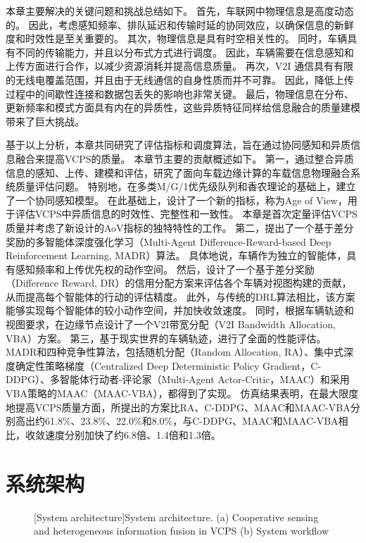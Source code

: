 本章主要解决的关键问题和挑战总结如下。
首先，车联网中物理信息是高度动态的。
因此，考虑感知频率、排队延迟和传输时延的协同效应，以确保信息的新鲜度和时效性是至关重要的。
其次，物理信息是具有时空相关性的。
同时，车辆具有不同的传输能力，并且以分布式方式进行调度。
因此，车辆需要在信息感知和上传方面进行合作，以减少资源消耗并提高信息质量。
再次，V2I 通信具有有限的无线电覆盖范围，并且由于无线通信的自身性质而并不可靠。
因此，降低上传过程中的间歇性连接和数据包丢失的影响也非常关键。
最后，物理信息在分布、更新频率和模式方面具有内在的异质性，这些异质特征同样给信息融合的质量建模带来了巨大挑战。

基于以上分析，本章共同研究了评估指标和调度算法，旨在通过协同感知和异质信息融合来提高VCPS的质量。
本章节主要的贡献概述如下。
第一，通过整合异质信息的感知、上传、建模和评估，研究了面向车载边缘计算的车载信息物理融合系统质量评估问题。
特别地，在多类M/G/1优先级队列和香农理论的基础上，建立了一个协同感知模型。
在此基础上，设计了一个新的指标，称为Age of View，用于评估VCPS中异质信息的时效性、完整性和一致性。
本章是首次定量评估VCPS质量并考虑了新设计的AoV指标的独特特性的工作。
第二，提出了一个基于差分奖励的多智能体深度强化学习（Multi-Agent Difference-Reward-based Deep Reinforcement Learning, MADR）算法。
具体地说，车辆作为独立的智能体，具有感知频率和上传优先权的动作空间。
然后，设计了一个基于差分奖励（Difference Reward, DR）的信用分配方案来评估各个车辆对视图构建的贡献，从而提高每个智能体的行动的评估精度。
此外，与传统的DRL算法相比，该方案能够实现每个智能体的较小动作空间，并加快收敛速度。
同时，根据车辆轨迹和视图要求，在边缘节点设计了一个V2I带宽分配（V2I Bandwidth Allocation, VBA）方案。
第三，基于现实世界的车辆轨迹，进行了全面的性能评估。
MADR和四种竞争性算法，包括随机分配（Random Allocation, RA）、集中式深度确定性策略梯度（Centralized Deep Deterministic Policy Gradient，C-DDPG）\cite{mlika2022deep}、多智能体行动者-评论家（Multi-Agent Actor-Critic，MAAC）\cite{he2021efficient}和采用VBA策略的MAAC（MAAC-VBA），都得到了实现。
仿真结果表明，在最大限度地提高VCPS质量方面，所提出的方案比RA、C-DDPG、MAAC和MAAC-VBA分别高出约61.8\%、23.8\%、22.0\%和8.0\%，与C-DDPG、MAAC和MAAC-VBA相比，收敛速度分别加快了约6.8倍、1.4倍和1.3倍。

\section{系统架构}\label{section 3-2}

\begin{figure}[h]
     \centering
     [System architecture]{System architecture. (a) Cooperative sensing and heterogeneous information fusion in VCPS (b) System workflow}
     \label{fig 3-1}
\end{figure}

